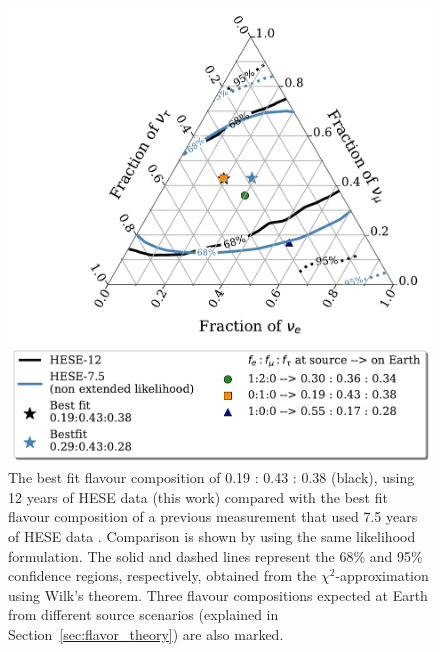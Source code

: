 \begin{figure}[h!]
    \caption[Profile likelihood scan of the astrophysical neutrino flavor composition at Earth, comparison with HESE-7.5 non extended likelihood]{The best fit flavour composition of 0.19 : 0.43 : 0.38 (black), using 12 years of HESE data (this work) compared with the best fit flavour composition of a previous measurement that used 7.5 years of HESE data \cite{Juliana_paper}. Comparison is shown by using the same likelihood formulation. The solid and dashed lines represent the 68\% and 95\% confidence regions, respectively, obtained from the $\chi^2$-approximation using Wilk's theorem. Three flavour compositions expected at Earth from different source scenarios (explained in Section~\ref{sec:flavor_theory}) are also marked.}
    \includegraphics{./figures/results/HESE7and12_nonextendedonly.pdf}


    
\end{figure}


